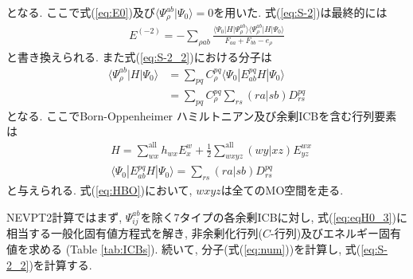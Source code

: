 \documentclass[11pt,pra,aps]{revtex4}
\begin{document}
となる. ここで式(\ref{eq:E0})及び$\langle\Psi_{\rho}^{ab}|\Psi_0\rangle=0$を用いた. 式(\ref{eq:S-2})は最終的には
\begin{align}
  E^{(-2)}=-\sum_{\rho ab} \frac{\langle\Psi_0|H|\Psi_{\rho}^{ab}\rangle\langle\Psi_{\rho}^{ab}|H|\Psi_0\rangle}{F_{aa}+F_{bb}-e_\rho} \label{eq:S-2_2}
\end{align}
と書き換えられる. また式(\ref{eq:S-2_2})における分子は
\begin{align}
  \langle\Psi_{\rho}^{ab}|H|\Psi_0\rangle&=\sum_{pq}C_\rho^{pq} \langle\Psi_0|E_{ab}^{pq}H|\Psi_0\rangle \nonumber \\
  &=\sum_{pq}C_\rho^{pq} \sum_{rs} (ra|sb) D^{pq}_{rs}
\end{align}
となる. ここでBorn-Oppenheimer ハミルトニアン及び余剰ICBを含む行列要素は
\begin{align}
  &H=\sum_{wx}^\text{all} h_{wx} E^w_x+\frac{1}{2}\sum_{wxyz}^\text{all} (wy|xz) E^{wx}_{yz} \label{eq:HBO} \\
  &\langle\Psi_0|E_{ab}^{pq}H|\Psi_0\rangle=\sum_{rs} (ra|sb) D^{pq}_{rs} \label{eq:numerator}
\end{align}
と与えられる. 式(\ref{eq:HBO})において, $wxyz$は全てのMO空間を走る. 

NEVPT2計算ではまず, $\Psi_{ij}^{ab}$を除く7タイプの各余剰ICBに対し, 式(\ref{eq:eqH0_3})に相当する一般化固有値方程式を解き, 非余剰化行列($C$-行列)及びエネルギー固有値を求める (Table \ref{tab:ICBs}). 続いて, 分子(式(\ref{eq:num}))を計算し, 式(\ref{eq:S-2_2})を計算する. 
\end{document}
